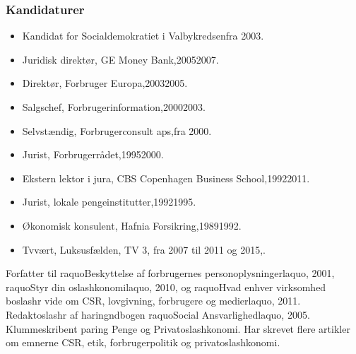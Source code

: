 \documentclass[11pt, a4paper]{awesome-cv}
\begin{document}
\begin{cvletter}
\subsubsection*{Kandidaturer}
\begin{itemize}
\item Kandidat for Socialdemokratiet i Valbykredsenfra 2003.
\end{itemize}
\begin{itemize}
\item Juridisk direktør, GE Money Bank,20052007.
\item Direktør, Forbruger Europa,20032005.
\item Salgschef, Forbrugerinformation,20002003.
\item Selvstændig, Forbrugerconsult aps,fra 2000.
\item Jurist, Forbrugerrådet,19952000.
\item Ekstern lektor i jura, CBS  Copenhagen Business School,19922011.
\item Jurist, lokale pengeinstitutter,19921995.
\item Økonomisk konsulent, Hafnia Forsikring,19891992.
\item Tvvært, Luksusfælden, TV 3, fra 2007 til 2011 og 2015,.
\end{itemize}
Forfatter til raquoBeskyttelse af forbrugernes personoplysningerlaquo, 2001, raquoStyr din oslashkonomilaquo, 2010, og raquoHvad enhver virksomhed boslashr vide om CSR, lovgivning, forbrugere og medierlaquo, 2011. Redaktoslashr af haringndbogen raquoSocial Ansvarlighedlaquo, 2005. Klummeskribent paring Penge og Privatoslashkonomi. Har skrevet flere artikler om emnerne CSR, etik, forbrugerpolitik og privatoslashkonomi.

\end{cvletter}
\end{document}
